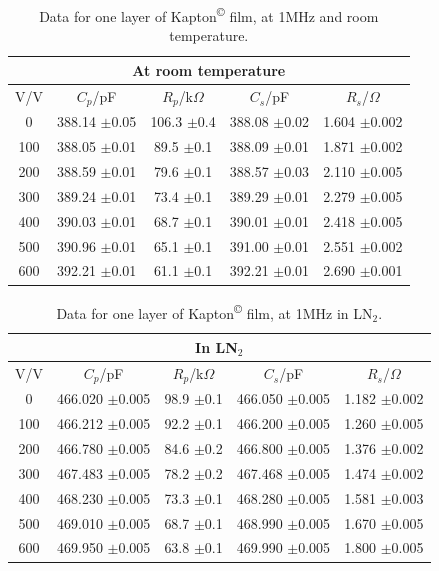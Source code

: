 \documentclass[a4paper,11pt]{article}
\begin{document}
\begin{table}[htbp]
\label{t:KapRT}
\begin{center}
	\caption{Data for one layer of Kapton\textsuperscript{\copyright} film, at 1MHz and room temperature.}
\begin{tabular}{| c | c | c | c | c |}
	\hline
	\multicolumn{5}{|c|}{At room temperature}\\
	\hline
		V/V & $C_{p}$/pF & $R_{p}$/k$\Omega$ & $C_{s}$/pF & $R_{s}$/$\Omega$\\ \hline
		
		0 & 388.14 $\pm$0.05 & 106.3 $\pm$0.4 & 388.08 $\pm$0.02 & 1.604 $\pm$0.002\\ \hline
		100 & 388.05 $\pm$0.01 & 89.5 $\pm$0.1 & 388.09 $\pm$0.01 & 1.871 $\pm$0.002\\ \hline
		200 & 388.59 $\pm$0.01 & 79.6 $\pm$0.1 & 388.57 $\pm$0.03 & 2.110 $\pm$0.005\\ \hline
		300 & 389.24 $\pm$0.01 & 73.4 $\pm$0.1 & 389.29 $\pm$0.01 & 2.279 $\pm$0.005\\ \hline
		400 & 390.03 $\pm$0.01 & 68.7 $\pm$0.1 & 390.01 $\pm$0.01 & 2.418 $\pm$0.005\\ \hline
		500 & 390.96 $\pm$0.01 & 65.1 $\pm$0.1 & 391.00 $\pm$0.01 & 2.551 $\pm$0.002\\ \hline
		600 & 392.21 $\pm$0.01 & 61.1 $\pm$0.1 & 392.21 $\pm$0.01 & 2.690 $\pm$0.001 \\
	\hline
\end{tabular}
\end{center}	
\end{table}


\begin{table}[htbp]
\label{t:KapLN2}
\begin{center}
	\caption{Data for one layer of Kapton\textsuperscript{\copyright} film, at 1MHz in LN$_{2}$.}
\begin{tabular}{| c | c | c | c | c |}
	\hline
	\multicolumn{5}{|c|}{In LN$_{2}$}\\
	\hline
		V/V & $C_{p}$/pF & $R_{p}$/k$\Omega$ & $C_{s}$/pF & $R_{s}$/$\Omega$\\ \hline
		
		0 & 466.020 $\pm$0.005 & 98.9 $\pm$0.1 & 466.050 $\pm$0.005 & 1.182 $\pm$0.002\\ \hline
		100 & 466.212 $\pm$0.005 & 92.2 $\pm$0.1 & 466.200 $\pm$0.005 & 1.260 $\pm$0.005\\ \hline
		200 & 466.780 $\pm$0.005 & 84.6 $\pm$0.2 & 466.800 $\pm$0.005 & 1.376 $\pm$0.002\\ \hline
		300 & 467.483 $\pm$0.005 & 78.2 $\pm$0.2 & 467.468 $\pm$0.005 & 1.474 $\pm$0.002\\ \hline
		400 & 468.230 $\pm$0.005 & 73.3 $\pm$0.1 & 468.280 $\pm$0.005 & 1.581 $\pm$0.003\\ \hline
		500 & 469.010 $\pm$0.005 & 68.7 $\pm$0.1 & 468.990 $\pm$0.005 & 1.670 $\pm$0.005\\ \hline
		600 & 469.950 $\pm$0.005 & 63.8 $\pm$0.1 & 469.990 $\pm$0.005 & 1.800 $\pm$0.005 \\
	\hline
\end{tabular}
\end{center}	
\end{table}
\end{document}
